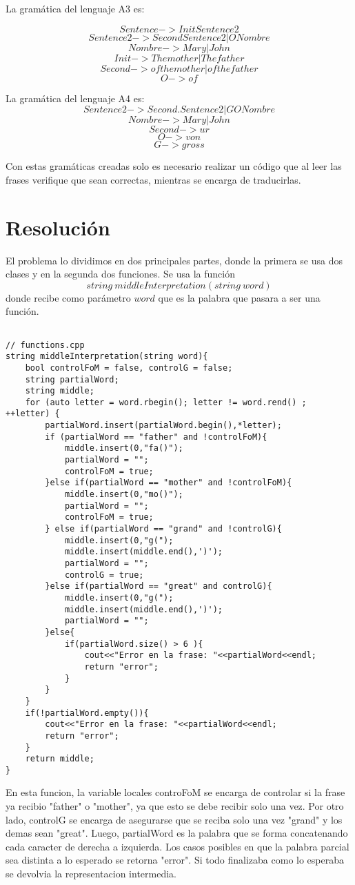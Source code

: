 \documentclass[conference]{IEEEtran}
\begin{document}
La gram\'atica del lenguaje A3 es:

$$Sentence    -> Init Sentence2$$
$$Sentence2   -> Second Sentence2 | O Nombre $$
$$Nombre      -> Mary | John$$
$$Init        -> The mother | The father $$
$$Second      -> of the mother | of the father$$ 
$$O           -> of$$

La gram\'atica del lenguaje A4 es:
$$Sentence2   -> Second.Sentence2 | G O Nombre $$
$$Nombre      -> Mary | John$$
$$Second      -> ur $$ 
$$O           -> von$$
$$G -> gross$$

Con estas gram\'aticas creadas solo es necesario realizar un c\'odigo que al leer las frases verifique que sean correctas, mientras se encarga de traducirlas.

\section{Resoluci\'on}

El problema lo dividimos en dos principales partes, donde la primera se usa dos clases y en la segunda dos funciones. Se usa la funci\'on $$string \  middleInterpretation(string \ word)$$
donde recibe como par\'ametro $word$ que es la palabra que pasara a ser una funci\'on. 

\begin{lstlisting}

// functions.cpp
string middleInterpretation(string word){
	bool controlFoM = false, controlG = false;
	string partialWord;
	string middle;
	for (auto letter = word.rbegin(); letter != word.rend() ; ++letter) {
		partialWord.insert(partialWord.begin(),*letter);
		if (partialWord == "father" and !controlFoM){
			middle.insert(0,"fa()");
			partialWord = "";
			controlFoM = true;
		}else if(partialWord == "mother" and !controlFoM){
			middle.insert(0,"mo()");
			partialWord = "";
			controlFoM = true;
		} else if(partialWord == "grand" and !controlG){
			middle.insert(0,"g(");
			middle.insert(middle.end(),')');
			partialWord = "";
			controlG = true;
		}else if(partialWord == "great" and controlG){
			middle.insert(0,"g(");
			middle.insert(middle.end(),')');
			partialWord = "";
		}else{
			if(partialWord.size() > 6 ){
				cout<<"Error en la frase: "<<partialWord<<endl;
				return "error";
			}
		}
	}
	if(!partialWord.empty()){
		cout<<"Error en la frase: "<<partialWord<<endl;
		return "error";
	}
	return middle;
}

\end{lstlisting}
	
En esta funcion, la variable locales controFoM se encarga de controlar si la frase ya recibio "father" o "mother", ya que esto se debe recibir solo una vez. Por otro lado, controlG se encarga de asegurarse que se reciba solo una vez "grand" y los demas sean "great". Luego, partialWord es la palabra que se forma concatenando cada caracter de derecha a izquierda. Los casos posibles en que la palabra parcial sea distinta a lo esperado se retorna "error". Si todo finalizaba como lo esperaba se devolvia la representacion intermedia.
\end{document}
